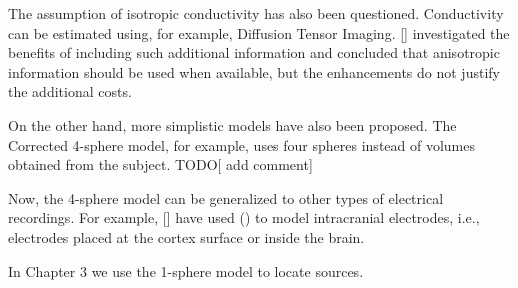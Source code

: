 The assumption of isotropic conductivity has also been questioned.
%
Conductivity can be estimated using, for example, Diffusion Tensor Imaging.
%
[] investigated the benefits of including such additional information and concluded that anisotropic information should be used when available, but the enhancements do not justify the additional costs.

On the other hand, more simplistic models have also been proposed.
%
The Corrected 4-sphere model, for example, uses four spheres instead of volumes obtained from the subject.
%
TODO[ add comment]

Now, the 4-sphere model can be generalized to other types of electrical recordings.
%
For example, [] have used () to model intracranial electrodes, i.e., electrodes placed at the cortex surface or inside the brain.

In Chapter 3 we use the 1-sphere model to locate sources. 